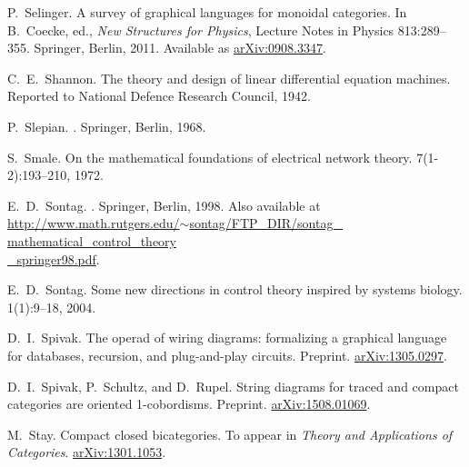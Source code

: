 \begin{thebibliography}{RSW00}
    P.\ Selinger.
    \newblock A survey of graphical languages
    for monoidal categories.
    \newblock In B.\ Coecke, ed., \emph{New Structures for
    Physics}, Lecture Notes in Physics 813:289--355. Springer, Berlin, 2011.
    \newblock Available
    as \href{http://arxiv.org/abs/0908.3347}{arXiv:0908.3347}.

    C.\ E.\ Shannon.
    \newblock The theory and design of linear differential equation machines. Reported to National Defence Research Council, 1942.


    P.\ Slepian.
    . Springer, Berlin, 1968. 

    S.\ Smale.
    \newblock On the mathematical foundations of electrical
    network theory.
     { 7}(1-2):193--210, 1972. 

    E.\ D.\ Sontag.
    . Springer, Berlin, 1998. 
    \newblock Also available at \\
    \href{http://www.math.rutgers.edu/~sontag/FTP_DIR/sontag_mathematical_control_theory_springer98.pdf}
    {http://www.math.rutgers.edu/$\sim$sontag/FTP\_DIR/sontag\_ mathematical\_control\_theory\\\_springer98.pdf}.

    E.\ D.\ Sontag. 
    \newblock Some new directions in control theory inspired
    by systems biology.
     { 1}(1):9--18, 2004. 


    D.\ I.\  Spivak.
    \newblock The operad of wiring diagrams:
    formalizing a graphical language for databases, recursion, and plug-and-play
    circuits.
    \newblock Preprint.
    \newblock 
    \href{http://arxiv.org/abs/1305.0297}{arXiv:1305.0297}.

    D.\ I.\ Spivak, P.\ Schultz, and D.\ Rupel.
    \newblock String diagrams for traced and compact categories are oriented
    1-cobordisms.
    \newblock Preprint.
    \newblock \href{http://arxiv.org/abs/1508.01069}{arXiv:1508.01069}.

    M.\ Stay.
    \newblock Compact closed bicategories.
    \newblock To appear in {\em Theory and Applications of Categories}.
    \newblock \href{http://arxiv.org/abs/1301.1053}{arXiv:1301.1053}.


\end{thebibliography}
